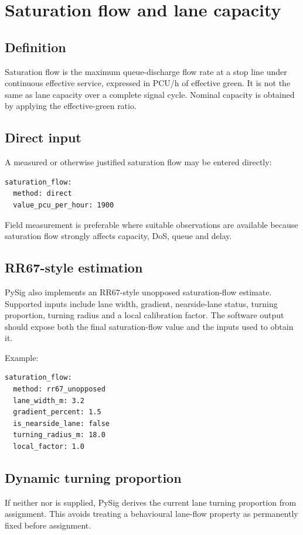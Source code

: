 \chapter{Saturation flow and lane capacity}
\label{chap:saturation-flow}

\section{Definition}
Saturation flow is the maximum queue-discharge flow rate at a stop line under continuous
effective service, expressed in PCU/h of effective green.  It is not the same as lane
capacity over a complete signal cycle.  Nominal capacity is obtained by applying the
effective-green ratio.

\section{Direct input}
A measured or otherwise justified saturation flow may be entered directly:
\begin{verbatim}
saturation_flow:
  method: direct
  value_pcu_per_hour: 1900
\end{verbatim}
Field measurement is preferable where suitable observations are available because
saturation flow strongly affects capacity, DoS, queue and delay.

\section{RR67-style estimation}
PySig also implements an RR67-style unopposed saturation-flow estimate.  Supported
inputs include lane width, gradient, nearside-lane status, turning proportion,
turning radius and a local calibration factor.  The software output should expose both
the final saturation-flow value and the inputs used to obtain it.

Example:
\begin{verbatim}
saturation_flow:
  method: rr67_unopposed
  lane_width_m: 3.2
  gradient_percent: 1.5
  is_nearside_lane: false
  turning_radius_m: 18.0
  local_factor: 1.0
\end{verbatim}

\section{Dynamic turning proportion}
If neither  nor  is supplied,
PySig derives the current lane turning proportion from assignment.  This avoids treating
a behavioural lane-flow property as permanently fixed before assignment.

